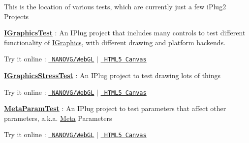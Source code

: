 This is the location of various tests, which are currently just a few i\+Plug2 Projects


\begin{DoxyItemize}
\item {\bfseries{\mbox{\hyperlink{class_i_graphics_test}{I\+Graphics\+Test}}}} \+: An I\+Plug project that includes many controls to test different functionality of \mbox{\hyperlink{class_i_graphics}{I\+Graphics}}, with different drawing and platform backends.

Try it online \+: \href{https://iplug2.github.io/NANOVG/IGraphicsTest/}{\texttt{ N\+A\+N\+O\+V\+G/\+Web\+GL}} $\vert$ \href{https://iplug2.github.io/CANVAS/IGraphicsTest/}{\texttt{ H\+T\+M\+L5 Canvas}}
\item {\bfseries{\mbox{\hyperlink{class_i_graphics_stress_test}{I\+Graphics\+Stress\+Test}}}} \+: An I\+Plug project to test drawing lots of things

Try it online \+: \href{https://iplug2.github.io/NANOVG/IGraphicsStressTest/}{\texttt{ N\+A\+N\+O\+V\+G/\+Web\+GL}} $\vert$ \href{https://iplug2.github.io/CANVAS/IGraphicsStressTest/}{\texttt{ H\+T\+M\+L5 Canvas}}
\item {\bfseries{\mbox{\hyperlink{class_meta_param_test}{Meta\+Param\+Test}}}} \+: An I\+Plug project to test parameters that affect other parameters, a.\+k.\+a. \mbox{\hyperlink{struct_meta}{Meta}} Parameters

Try it online \+: \href{https://iplug2.github.io/NANOVG/MetaParamTest/}{\texttt{ N\+A\+N\+O\+V\+G/\+Web\+GL}} $\vert$ \href{https://iplug2.github.io/CANVAS/MetaParamTest/}{\texttt{ H\+T\+M\+L5 Canvas}} 
\end{DoxyItemize}